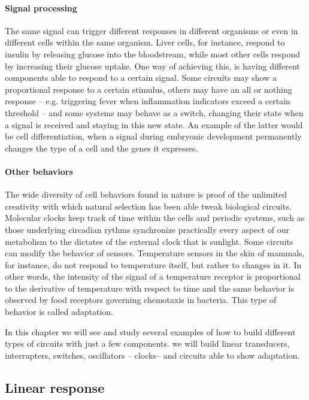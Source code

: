 \paragraph{Signal processing} The same signal can trigger different responses in different organisms or even in different cells within the same organism. Liver cells, for instance, respond to insulin by releasing glucose into the bloodstream, while most other cells respond by increasing their glucose uptake. One way of achieving this, is having different components able to respond to a certain signal. Some circuits may show a proportional response to a certain stimulus, others may have an all or nothing response -- e.g. triggering fever when inflammation indicators exceed a certain threshold -- and some systems may behave as a switch, changing their state when a signal is received and staying in this new state. An example of the latter would be cell differentiation, when a signal during embryonic development permanently changes the type of a cell and the genes it expresses.

\paragraph{Other behaviors} The wide diversity of cell behaviors found in nature is proof of the unlimited creativity with which natural selection has been able tweak biological circuits. Molecular clocks keep track of time within the cells and periodic systems, such as those underlying circadian rythms synchronize practically every aspect of our metabolism to the dictates of the  external clock that is sunlight. Some circuits can modify the behavior of sensors. Temperature sensors in the skin of mammals, for instance, do not respond to temperature itself, but rather to changes in it. In other words, the intensity of the signal of a temperature receptor is proportional to the derivative of temperature with respect to time and the same behavior is observed by food receptors governing chemotaxis in bacteria. This type of behavior is called adaptation. 


In this chapter we will see and study several examples of how to build different types of circuits with just a few components. we will build linear transducers, interrupters, switches, oscillators -- clocks-- and circuits able to show adaptation.

\subsection{Linear response}

